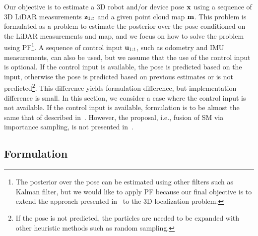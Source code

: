 \documentclass[letterpaper, 10 pt, conference]{ieeeconf}  %
\begin{document}
Our objective is to estimate a 3D robot and/or device pose ${\bf x}$ using a sequence of 3D LiDAR measurements ${\bf z}_{1:t}$ and a given point cloud map ${\bf m}$.
This problem is formulated as a problem to estimate the posterior over the pose conditioned on the LiDAR measurements and map, and we focus on how to solve the problem using PF\footnote{The posterior over the pose can be estimated using other filters such as Kalman filter, but we would like to apply PF because our final objective is to extend the approach presented in~\cite{AkaiJFR2023} to the 3D localization problem.}.
A sequence of control input ${\bf u}_{1:t}$, such as odometry and IMU measurements, can also be used, but we assume that the use of the control input is optional.
If the control input is available, the pose is predicted based on the input, otherwise the pose is predicted based on previous estimates or is not predicted\footnote{If the pose is not predicted, the particles are needed to be expanded with other heuristic methods such as random sampling.}.
This difference yields formulation difference, but implementation difference is small.
In this section, we consider a case where the control input is not available.
If the control input is available, formulation is to be almost the same that of described in~\cite{Thrun:2005:PR:1121596}.
However, the proposal, i.e., fusion of SM via importance sampling, is not presented in~\cite{Thrun:2005:PR:1121596}.



\subsection{Formulation}
\label{subsec:formulation}
\end{document}
